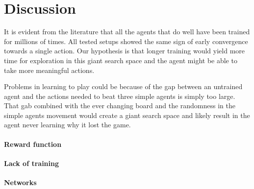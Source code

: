 \section{Discussion}
\label{sec:discussion}
It is evident from the literature that all the agents that do well have been trained for millions of times.\cite{rwightman} All tested setups showed the same sign of early convergence towards a single action. Our hypothesis is that longer training would yield more time for exploration in this giant search space and the agent might be able to take more meaningful actions.

Problems in learning to play could be because of the gap between an untrained agent and the actions needed to beat three simple agents is simply too large. That gab combined with the ever changing board and the randomness in the simple agents movement would create a giant search space and likely result in the agent never learning why it lost the game.






\paragraph{Reward function}

\paragraph{Lack of training}

\paragraph{Networks}